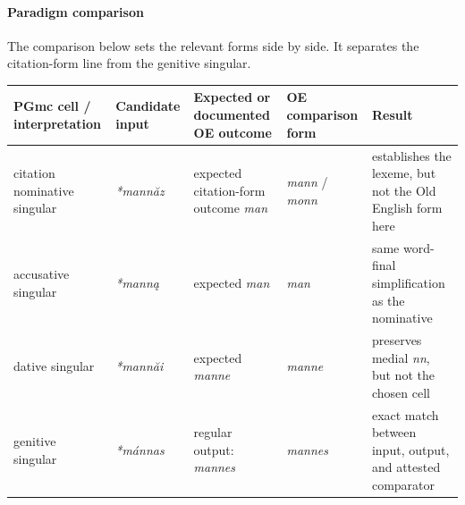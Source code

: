 \documentclass[
  british,
  a4paper,
]{article}
\newcounter{none} %
\begin{document}
\paragraph{Paradigm comparison}\label{paradigm-comparison-15}

The comparison below sets the relevant forms side by side. It separates
the citation-form line from the genitive singular.

{\def\LTcaptype{none} %
\begin{longtable}[]{@{}
  >{\raggedright\arraybackslash}p{}
  >{\raggedright\arraybackslash}p{}
  >{\raggedright\arraybackslash}p{}
  >{\raggedright\arraybackslash}p{}
  >{\raggedright\arraybackslash}p{}@{}}
\toprule\noalign{}
\begin{minipage}[b]{\linewidth}\raggedright
PGmc cell / interpretation
\end{minipage} & \begin{minipage}[b]{\linewidth}\raggedright
Candidate input
\end{minipage} & \begin{minipage}[b]{\linewidth}\raggedright
Expected or documented OE outcome
\end{minipage} & \begin{minipage}[b]{\linewidth}\raggedright
OE comparison form
\end{minipage} & \begin{minipage}[b]{\linewidth}\raggedright
Result
\end{minipage} \\
\midrule\noalign{}
\endhead
\bottomrule\noalign{}
\endlastfoot
citation nominative singular & {\emph{*mannăz}} & expected citation-form
outcome {\emph{man}} & {\emph{mann}} / {\emph{monn}} & establishes the
lexeme, but not the Old English form here \\
accusative singular & {\emph{*manną}} & expected {\emph{man}} &
{\emph{man}} & same word-final simplification as the nominative \\
dative singular & {\emph{*mannăi}} & expected {\emph{manne}} &
{\emph{manne}} & preserves medial \emph{nn}, but not the chosen cell \\
genitive singular & {\emph{*mánnas}} & regular output: {\emph{mannes}} &
{\emph{mannes}} & exact match between input, output, and attested
comparator \\
\end{longtable}
}
\end{document}

